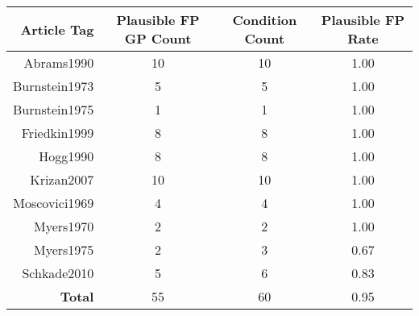 
\begin{tabular}{rccc}
\toprule
\textbf{Article Tag} & \textbf{Plausible FP GP Count} & \textbf{Condition Count} & \textbf{Plausible FP Rate}\\
\midrule
Abrams1990 & 10 & 10 & 1.00\\
Burnstein1973 & 5 & 5 & 1.00\\
Burnstein1975 & 1 & 1 & 1.00\\
Friedkin1999 & 8 & 8 & 1.00\\
Hogg1990 & 8 & 8 & 1.00\\
\addlinespace
Krizan2007 & 10 & 10 & 1.00\\
Moscovici1969 & 4 & 4 & 1.00\\
Myers1970 & 2 & 2 & 1.00\\
Myers1975 & 2 & 3 & 0.67\\
Schkade2010 & 5 & 6 & 0.83\\
\midrule
\textbf{Total} & 55 & 60 & 0.95 \\
\bottomrule
\end{tabular}

